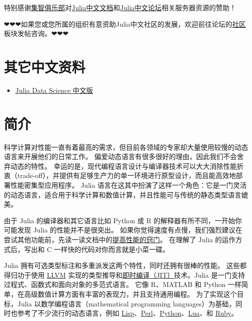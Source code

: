 特别感谢\href{https://swarma.org}{集智俱乐部}对\href{https://docs.juliacn.com/}{Julia中文文档}和\href{https://discourse.juliacn.com/}{Julia中文论坛}相关服务器资源的赞助！



❤❤❤如果您或您所属的组织有意资助Julia中文社区的发展，欢迎前往论坛的\href{https://discourse.juliacn.com/c/community/13}{社区}板块发帖咨询。❤❤❤



\hypertarget{7405301553421440064}{}


\chapter{其它中文资料}



\begin{itemize}
\item \href{https://cn.julialang.org/JuliaDataScience/}{Julia Data Science 中文版}

\end{itemize}


\hypertarget{3498245216777255645}{}


\chapter{简介}



科学计算对性能一直有着最高的需求，但目前各领域的专家却大量使用较慢的动态语言来开展他们的日常工作。 偏爱动态语言有很多很好的理由，因此我们不会舍弃动态的特性。 幸运的是，现代编程语言设计与编译器技术可以大大消除性能折衷（trade-off），并提供有足够生产力的单一环境进行原型设计，而且能高效地部署性能密集型应用程序。 Julia 语言在这其中扮演了这样一个角色：它是一门灵活的动态语言，适合用于科学计算和数值计算，并且性能可与传统的静态类型语言媲美。



由于 Julia 的编译器和其它语言比如 Python 或 R 的解释器有所不同，一开始你可能发现 Julia 的性能并不是很突出。 如果你觉得速度有点慢，我们强烈建议在尝试其他功能前，先读一读文档中的\hyperlink{818954303942149020}{提高性能的窍门}。 在理解了 Julia 的运作方式后，写出和 C 一样快的代码对你而言就是小菜一碟。



Julia 拥有可选类型标注和多重派发这两个特性，同时还拥有很棒的性能。 这些都得归功于使用 \href{https://discourse.juliacn.com/t/topic/4203\#llvm}{LLVM} 实现的类型推导和\href{https://discourse.juliacn.com/t/topic/4203\#just-in-time-compilation}{即时编译（JIT）}技术。Julia 是一门支持过程式、函数式和面向对象的多范式语言。 它像 R、MATLAB 和 Python 一样简单，在高级数值计算方面有丰富的表现力，并且支持通用编程。 为了实现这个目标，Julia 以数学编程语言（mathematical programming languages）为基础，同时也参考了不少流行的动态语言，例如 \href{https://discourse.juliacn.com/t/topic/4203\#lisp}{Lisp}、\href{https://discourse.juliacn.com/t/topic/4203\#perl}{Perl}、\href{https://discourse.juliacn.com/t/topic/4203\#python}{Python}、\href{https://discourse.juliacn.com/t/topic/4203\#lua}{Lua}、和 \href{https://discourse.juliacn.com/t/topic/4203\#ruby}{Ruby}。




